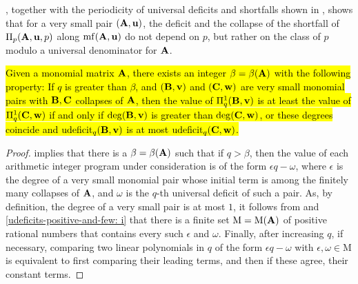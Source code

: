 \documentclass{article}
\newcommand{\AIP}{\Pi}
\begin{document}
\begin{remark} \label{program behavior small: R}
   , together with the periodicity of universal deficits and shortfalls shown in , shows that for a very small pair $(\mathbf{A},\mathbf{u})$, the deficit and the collapse of the shortfall of  $\Pi_p(\mathbf{A},\mathbf{u},p)$ along $\operatorname{mf}(\mathbf{A}, \mathbf{u})$ do not depend on $p$,  but rather on the class of $p$ modulo a universal denominator for $\mathbf{A}$.
\end{remark}

\begin{corollary}
\label{easy-to-compare-values-of-first-AIP: C}  
\hl{Given a monomial matrix $\mathbf{A}$, there exists an integer $\beta = \beta(\mathbf{A})$ with the following property\textup:  If $q$ is greater than $\beta$, and $(\mathbf{B}, \mathbf{v})$ and $(\mathbf{C}, \mathbf{w})$ are very small monomial pairs with $\mathbf{B}, \mathbf{C}$ collapses of $\mathbf{A}$, then the value of $\AIP_q^1(\matB, \vv{v})$ is at least the value of $\AIP_q^1(\matC, \vv{w})$ if and only if  $\deg (\mathbf{B}, \mathbf{v})$ is greater than $\deg (\mathbf{C}, \mathbf{w})$, or these degrees coincide and $\operatorname{udeficit}_q(\mathbf{B}, \mathbf{v})$ is at most  $\operatorname{udeficit}_q(\mathbf{C}, \mathbf{w})$.}
\end{corollary}

\begin{proof}  
 implies that there is a $\beta = \beta(\mathbf{A})$ such that if $q > \beta$,  then the value of each arithmetic integer program under consideration is of the form $\epsilon q - \omega$, where $\epsilon$ is the degree of a very small monomial pair whose initial term is among the finitely many collapses of $\mathbf{A}$, and $\omega$ is the $q$-th universal deficit of such a pair.  As, by definition, the degree of a very small pair is at most $1$, it follows from  and \ref{udeficits-positive-and-few: i} that there is a finite set $\mathrm{M} = \mathrm{M}(\mathbf{A})$ of positive rational numbers that contains every such $\epsilon$ and $\omega$.  Finally, after increasing $q$, if necessary, comparing two linear polynomials in $q$ of the form $\epsilon q - \omega$ with $\epsilon, \omega \in \mathrm{M}$ is equivalent to first comparing their leading terms, and then if these agree, their constant terms.
\end{proof}
\end{document}
